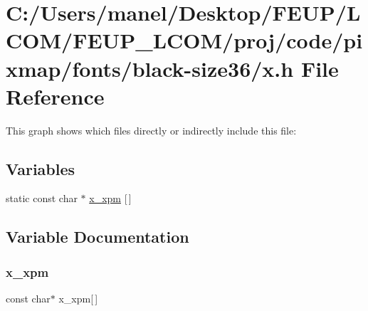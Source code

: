 \hypertarget{black-size36_2x_8h}{}\section{C\+:/\+Users/manel/\+Desktop/\+F\+E\+U\+P/\+L\+C\+O\+M/\+F\+E\+U\+P\+\_\+\+L\+C\+O\+M/proj/code/pixmap/fonts/black-\/size36/x.h File Reference}
\label{black-size36_2x_8h}
This graph shows which files directly or indirectly include this file\+:
\subsection*{Variables}
\begin{DoxyCompactItemize}
\item 
static const char $\ast$ \mbox{\hyperlink{black-size36_2x_8h_a52ed9c254867190feb0e53b6f56a31d5}{x\+\_\+xpm}} \mbox{[}$\,$\mbox{]}
\end{DoxyCompactItemize}


\subsection{Variable Documentation}
\mbox{\label{black-size36_2x_8h_a52ed9c254867190feb0e53b6f56a31d5}} 
\subsubsection{\texorpdfstring{x\_xpm}{x\_xpm}}
{\footnotesize\ttfamily const char$\ast$ x\+\_\+xpm\mbox{[}$\,$\mbox{]}\hspace{0.3cm}{\ttfamily [static]}}

